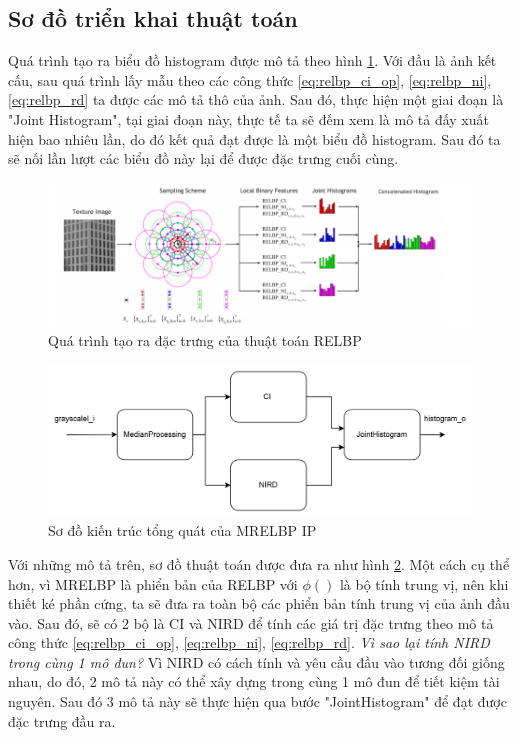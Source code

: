 \subsection{Sơ đồ triển khai thuật toán}
Quá trình tạo ra biểu đồ histogram được mô tả theo hình \ref{fig:histogramStep}. Với đầu là ảnh kết cấu, sau quá trình lấy mẫu theo các công thức \ref{eq:relbp_ci_op}, \ref{eq:relbp_ni}, \ref{eq:relbp_rd} ta được các mô tả thô của ảnh. Sau đó, thực hiện một giai đoạn là "Joint Histogram", tại giai đoạn này, thực tế ta sẽ đếm xem là mô tả đấy xuất hiện bao nhiêu lần, do đó kết quả đạt được là một biểu đồ histogram. Sau đó ta sẽ nối lần lượt các biểu đồ này lại để được đặc trưng cuối cùng. 

\begin{figure} [!ht]
	\centering
	\includegraphics[width= 1\linewidth]{figures/histogramStep.png}
	\caption{Quá trình tạo ra đặc trưng của thuật toán RELBP \cite{realTimeTexture}}
	\label{fig:histogramStep}
\end{figure} 


\begin{figure} [!ht]
	\centering
	\includegraphics[width= 1\linewidth]{figures/fullArch.png}
	\caption{Sơ đồ kiến trúc tổng quát của MRELBP IP}
	\label{fig:fullArch}
\end{figure} 


Với những mô tả trên, sơ đồ thuật toán được đưa ra như hình \ref{fig:fullArch}. Một cách cụ thể hơn, vì MRELBP là phiển bản của RELBP với $\phi()$ là bộ tính trung vị, nên khi thiết ké phần cứng, ta sẽ đưa ra toàn bộ các phiển bản tính trung vị của ảnh đầu vào. Sau đó, sẽ có 2 bộ là CI và NIRD để tính các giá trị đặc trưng theo mô tả công thức \ref{eq:relbp_ci_op}, \ref{eq:relbp_ni}, \ref{eq:relbp_rd}. \textit{Vì sao lại tính NIRD trong cùng 1 mô đun?} Vì NIRD có cách tính và yêu cầu đầu vào tương đối giống nhau, do đó, 2 mô tả này có thể xây dựng trong cùng 1 mô đun để tiết kiệm tài nguyên. Sau đó 3 mô tả này sẽ thực hiện qua bước "JointHistogram" để đạt được đặc trưng đầu ra.


